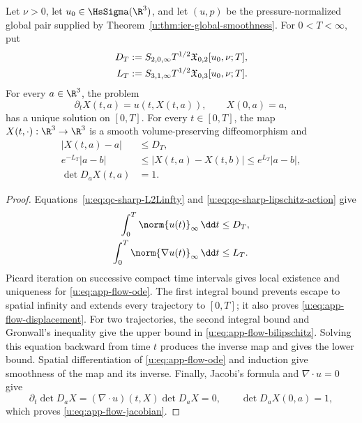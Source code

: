 \begin{theorem}
\label{u:thm:app-material-flow}
Let \(\nu>0\), let \(u_0\in\HsSigma(\R^3)\), and let \((u,p)\) be
the pressure-normalized global pair supplied by
Theorem~\ref{u:thm:ier-global-smoothness}.
For \(0<T<\infty\), put
\begin{align}
 D_T&:=S_{2,0,\infty}T^{1/2}
 \mathfrak X_{0,2}[u_0,\nu;T],\notag\\
 L_T&:=S_{3,1,\infty}T^{1/2}
 \mathfrak X_{0,3}[u_0,\nu;T].
 \label{u:eq:app-flow-actions}
\end{align}
For every \(a\in\R^3\), the problem
\begin{equation}
 \partial_tX(t,a)=u(t,X(t,a)),
 \qquad X(0,a)=a,
 \label{u:eq:app-flow-ode}
\end{equation}
has a unique solution on \([0,T]\).  For every \(t\in[0,T]\), the map
\(X(t,\cdot):\R^3\to\R^3\) is a smooth volume-preserving diffeomorphism
and
\begin{align}
 |X(t,a)-a|&\le D_T,
 \label{u:eq:app-flow-displacement}\\
 e^{-L_T}|a-b|
 &\le|X(t,a)-X(t,b)|
 \le e^{L_T}|a-b|,
 \label{u:eq:app-flow-bilipschitz}\\
 \det D_aX(t,a)&=1.
 \label{u:eq:app-flow-jacobian}
\end{align}
\end{theorem}

\begin{proof}
Equations~\eqref{u:eq:qc-sharp-L2Linfty} and
\eqref{u:eq:qc-sharp-lipschitz-action} give
\begin{align*}
 \int_0^T\norm{u(t)}_\infty\,\dd t&\le D_T,\\
 \int_0^T\norm{\nabla u(t)}_\infty\,\dd t&\le L_T.
\end{align*}
Picard iteration on successive compact time intervals gives local
existence and uniqueness for \eqref{u:eq:app-flow-ode}.  The first integral
bound prevents escape to spatial infinity and extends every trajectory to
\([0,T]\); it also proves \eqref{u:eq:app-flow-displacement}.  For two
trajectories, the second integral bound and Gronwall's inequality give the
upper bound in \eqref{u:eq:app-flow-bilipschitz}.  Solving this equation
backward from time \(t\) produces the inverse map and gives the lower
bound.  Spatial differentiation of \eqref{u:eq:app-flow-ode} and induction
give smoothness of the map and its inverse.  Finally, Jacobi's formula and
\(\nabla\cdot u=0\) give
\[
 \partial_t\det D_aX
 =(\nabla\cdot u)(t,X)\det D_aX=0,
 \qquad \det D_aX(0,a)=1,
\]
which proves \eqref{u:eq:app-flow-jacobian}.
\end{proof}

